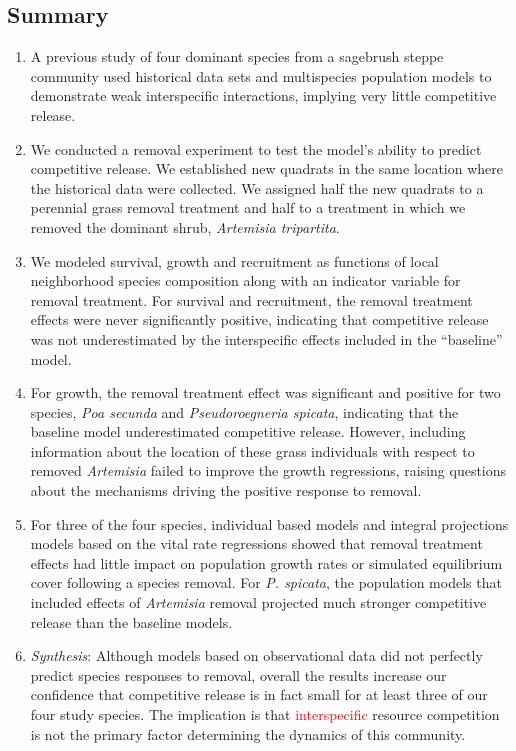 \documentclass[11pt]{article}
\newcommand{\new}{\textcolor{red}}
\begin{document}
\begin{doublespacing} 

\linenumbers

\section*{Summary}

\begin{enumerate}
\item A previous study of four dominant species from a sagebrush steppe community used historical data sets and multispecies population models to demonstrate weak interspecific interactions, implying very little competitive release. 
\item We conducted a removal experiment to test the model's ability to predict competitive release. We established new quadrats in the same location where the historical data were collected. We assigned half the new quadrats to a  perennial grass removal treatment and half to a treatment in which we removed the dominant shrub, \textit{Artemisia tripartita}.
\item We modeled survival, growth and recruitment as functions of local neighborhood species composition along with an indicator variable for removal treatment. For survival and recruitment, the removal treatment effects were never significantly positive, indicating that competitive release was not underestimated by the interspecific effects included in the ``baseline'' model. 
\item For growth, the removal treatment effect was significant and positive for two species, \textit{Poa secunda} and \textit{Pseudoroegneria spicata}, indicating that the baseline model underestimated competitive release. However, including information about the location of these grass individuals with respect to removed \textit{Artemisia} failed to improve the growth regressions, raising questions about the mechanisms driving the positive response to removal.
\item For three of the four species, individual based models and integral projections models  based on the vital rate regressions showed that removal treatment effects had little impact on population growth rates or simulated equilibrium cover following a species removal. For \textit{P. spicata}, the population models that included effects of \textit{Artemisia} removal projected much stronger competitive release than the baseline models. 
\item \emph{Synthesis}: Although models based on observational data did not perfectly predict species responses to removal, overall the results increase our confidence that competitive release is in fact small for at least three of our four study species. The implication is that \new{interspecific} resource competition is not the primary factor determining the dynamics of this community.


\end{enumerate}
\end{doublespacing}
\end{document}
